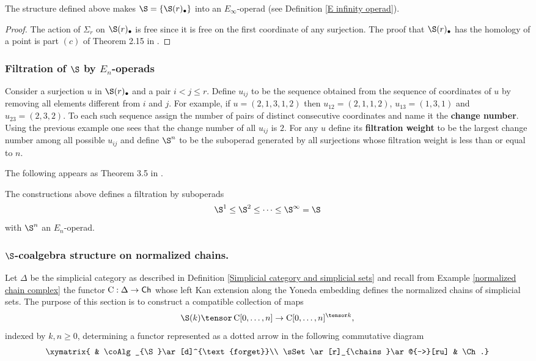 \documentclass[thesis.tex]{subfiles}
\begin{document}
\begin{lemma}
The structure defined above makes $\S=\{\S(r)_\bullet\}$ into an $E_{\infty}$-operad (see Definition \ref{E infinity operad}).
\begin{proof}
The action of $\Sigma_r$ on $\S(r)_\bullet$ is free since it is free on the first coordinate of any surjection. The proof that $\S(r)_\bullet$ has the homology of a point is part $(c)$ of Theorem 2.15 in \cite{MS03}.
\end{proof}
\end{lemma}

\subsubsection{Filtration of $\S$ by $E_n$-operads}

Consider a surjection $u$ in $\S(r)_\bullet$ and a pair $i<j\leq r$. Define $u_{ij}$ to be the sequence obtained from the sequence of coordinates of $u$ by removing all elements different from $i$ and $j$. For example, if $u=(2,1,3,1,2)$ then $u_{12}=(2,1,1,2)$, $u_{13}=(1,3,1)$ and $u_{23}=(2,3,2)$. To each such sequence assign the number of pairs of distinct consecutive coordinates and name it the \textbf{change number}. Using the previous example one sees that the change number of all $u_{ij}$ is $2$. For any $u$ define its \textbf{filtration weight} to be the largest change number among all possible $u_{ij}$ and define $\S^n$ to be the suboperad generated by all surjections whose filtration weight is less than or equal to $n$.

The following appears as Theorem 3.5 in \cite{MS03}.
\begin{lemma}\label{filtration by E_n}
The constructions above defines a filtration by suboperads
$$\S^1\leq\S^2\leq\dotsb\leq\S^\infty=\S$$
with $\S^n$ an $E_n$-operad.
\end{lemma}

\subsubsection{$\S$-coalgebra structure on normalized chains.} Let $\Delta$ be the simplicial category as described in Definition \ref{Simplicial category and simplicial sets} and recall from Example \ref{normalized chain complex} the functor $\operatorname{C}:\Delta\to\mathsf{Ch}$ whose left Kan extension along the Yoneda embedding defines the normalized chains of simplicial sets. The purpose of this section is to construct a compatible collection of maps
$$\S(k)\tensor\chains[0,\dotsc,n]\to\chains[0,\dotsc,n]^{\tensor k},$$
indexed by $k,n\geq0$, determining a functor represented as a dotted arrow in the following commutative diagram
$$\xymatrix{ & \coAlg_{\S}\ar[d]^{\text{forget}}\\ \sSet \ar[r]_{\chains}\ar@{-->}[ru] & \Ch.}$$
\end{document}
